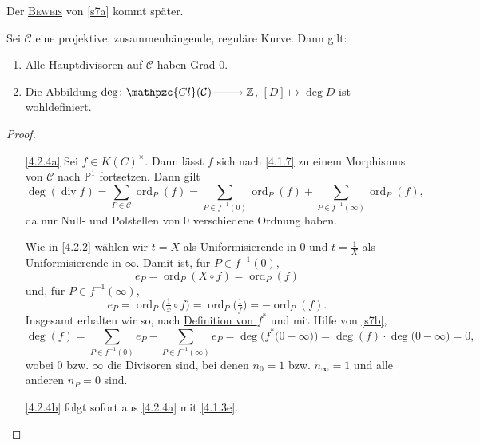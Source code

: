 \documentclass[a4paper,12pt,index=toc]{scrbook}
\theoremstyle{keinenummern} %
\def\CC{\mathcal{C}}
\def\P{\mathbb{P}}
\newcommand{\Cl}{\mathpzc{Cl}}
\renewcommand{\div}{\operatorname{div}}
\newcommand{\ord}{\operatorname{ord}}
\newcommand{\set}[1]{\ensuremath{\mathbb{#1}}}
\newcommand{\Z}{\set{Z}}
\begin{document}
Der \hyperlink{bews7}{{\scshape Beweis}} von \ref{s7a} kommt später.

\begin{kor}\label{4.2.4}
Sei $\CC$ eine projektive, zusammenhängende, reguläre Kurve. Dann gilt:
\begin{enumerate}
\item{} Alle Hauptdivisoren auf $\CC$ haben Grad $0$.
\item{} Die Abbildung $\deg\colon\Cl(\CC)\ra\Z$, $[D]\mapsto\deg D$ ist wohldefiniert.
\end{enumerate}\end{kor}

\begin{proof}
\begin{enumerate}
\item[\ref{4.2.4a}] Sei $f\in K(C)^{\times}$. Dann lässt $f$ sich nach \cref{4.1.7} zu einem Morphismus von $\CC$ nach $\P^{1}$ fortsetzen. Dann gilt
\begin{equation*}\deg(\div f)=\sum_{P\in\CC}\ord_{P}(f)=\!\!\!\sum_{P\in f^{-1}(0)}\!\!\ord_{P}(f)+\!\!\!\sum_{P\in f^{-1}(\infty)}\!\!\ord_{P}(f),\end{equation*}
da nur Null- und Polstellen von $0$ verschiedene Ordnung haben.

Wie in \cref{4.2.2} wählen wir $t=X$ als Uniformisierende in $0$ und $t=\frac{1}{X}$ als Uniformisierende in $\infty$. Damit ist, für $P\in f^{-1}(0)$,
\begin{equation*}e_{P}=\ord_{P}(X\circ f)=\ord_{P}(f)\end{equation*}
und, für $P\in f^{-1}(\infty)$,
\begin{equation*}e_{P}=\ord_{P}\bigl(\tfrac{1}{x}\circ f\bigr)=\ord_{P}\bigl(\tfrac{1}{f}\bigr)=-\ord_{P}(f).\end{equation*}
Insgesamt erhalten wir so, nach \hyperref[4.2.1b]{Definition von $f^{*}$} und mit Hilfe von \cref{s7b},
\begin{equation*}\deg(f)=\!\!\!\!\!\!\sum_{P\in f^{-1}(0)}\!\!\!\!\!e_{P}-\!\!\!\!\!\!\!\!\sum_{P\in f^{-1}(\infty)}\!\!\!\!\!\!e_{P}=\deg\bigl(f^{*}\bigl(0-\infty\bigr)\bigr)=\deg(f)\cdot \deg\bigl(0-\infty\bigr)=0,\end{equation*}
wobei $0$ bzw. $\infty$ die Divisoren sind, bei denen $n_{0}=1$ bzw. $n_{\infty}=1$ und alle anderen $n_{P}=0$ sind.
\item[\ref{4.2.4b}] folgt sofort aus \ref{4.2.4a} mit \cref{4.1.3e}.
\end{enumerate}
\end{proof}
\end{document}
